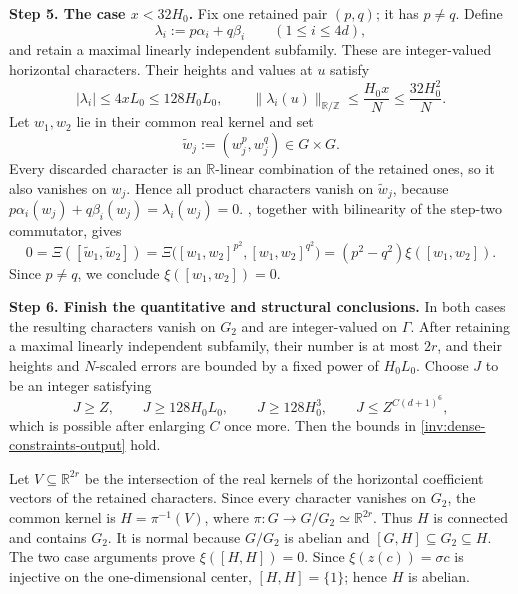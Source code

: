 \documentclass[twoside]{aomart}
\makeatletter
\theoremstyle{paperplain}
\theoremstyle{paperdefinition}
\renewenvironment{proof}[1][\proofname]{\par\pushQED{\qed}%
  \normalfont\topsep6\p@\@plus3\p@\relax\trivlist
  \item[\hskip\labelsep\itshape #1\@addpunct{.}]\ignorespaces
}{\popQED\endtrivlist\@endpefalse}
\numberwithin{equation}{section}
\makeatother
\begin{document}
\begin{proof}
\par
\medskip
\noindent\textbf{Step 5. The case $x<32H_0$.}
Fix one retained pair $(p,q)$; it has $p\ne q$. Define
\[
 \lambda_i:=p\alpha_i+q\beta_i
 \qquad(1\le i\le4d),
\]
and retain a maximal linearly independent subfamily. These are
integer-valued horizontal characters. Their heights and values at $u$
satisfy
\begin{equation*}
 |\lambda_i|\le4xL_0\le128H_0L_0,\qquad
 \|\lambda_i(u)\|_{\mathbb R/\mathbb Z}
 \le\frac{H_0x}{N}\le\frac{32H_0^2}{N}.
\end{equation*}
Let $w_1,w_2$ lie in their common real kernel and set
\[
 \widetilde w_j:=(w_j^p,w_j^q)\in G\times G.
\]
Every discarded character is an $\mathbb R$-linear combination of the
retained ones, so it also vanishes on $w_j$. Hence all product characters
vanish on $\widetilde w_j$, because
$p\alpha_i(w_j)+q\beta_i(w_j)=\lambda_i(w_j)=0$.
, together with bilinearity of the step-two commutator, gives
\begin{equation*}
 0=\Xi\!\left(
 [\widetilde w_1,\widetilde w_2]\right)
 =\Xi\bigl([w_1,w_2]^{p^2},[w_1,w_2]^{q^2}\bigr)
 =(p^2-q^2)\xi([w_1,w_2]).
\end{equation*}
Since $p\ne q$, we conclude $\xi([w_1,w_2])=0$.

\par
\medskip
\noindent\textbf{Step 6. Finish the quantitative and structural conclusions.}
In both cases the resulting characters vanish on $G_2$ and are
integer-valued on $\Gamma$. After retaining a maximal linearly
independent subfamily, their number is at most $2r$, and their
heights and $N$-scaled errors are bounded by a fixed power of $H_0L_0$.
Choose $J$ to be an integer satisfying
\[
 J\ge Z,\qquad
 J\ge128H_0L_0,\qquad
 J\ge128H_0^3,\qquad
 J\le Z^{C(d+1)^6},
\]
which is possible after enlarging $C$ once more. Then the bounds in
\eqref{inv:dense-constraints-output} hold.

Let $V\subseteq\mathbb R^{2r}$ be the intersection of the real kernels
of the horizontal coefficient vectors of the retained characters.
Since every character vanishes on $G_2$, the common kernel is
$H=\pi^{-1}(V)$, where $\pi:G\to G/G_2\simeq\mathbb R^{2r}$.
Thus $H$ is connected and contains $G_2$. It is normal because
$G/G_2$ is abelian and $[G,H]\subseteq G_2\subseteq H$. The two case
arguments prove $\xi([H,H])=0$. Since $\xi(z(c))=\sigma c$ is injective
on the one-dimensional center, $[H,H]=\{1\}$; hence $H$ is abelian.
\end{proof}
\end{document}

